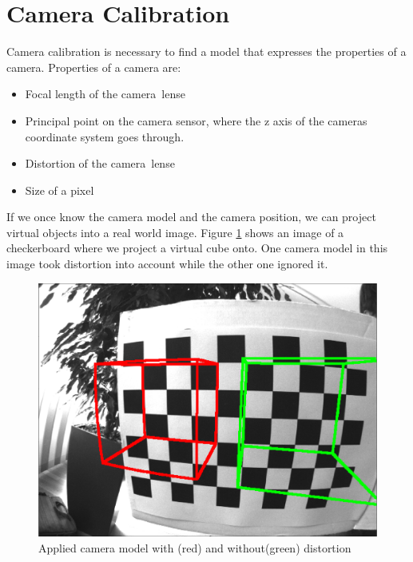 \documentclass[11pt,a4paper,titlepage,oneside]{report}
\begin{document}
\section{Camera Calibration}\label{sec:calibration}
Camera calibration is necessary to find a model that expresses the properties of a camera. Properties of a camera are:

\begin{itemize}
	\item Focal length of the camera lense
	\item Principal point on the camera sensor, where the z axis of the cameras coordinate system goes through.
	\item Distortion of the camera lense
	\item Size of a pixel
\end{itemize}

If we once know the camera model and the camera position, we can project virtual objects into a real world image. Figure \ref{fig:model} shows an image of a checkerboard where we project a virtual cube onto. One camera model in this image took distortion into account while the other one ignored it.
\begin{figure}[H]
  \begin{center}
		\includegraphics[width=1.0\textwidth]{img/model.png}
  \end{center}
	\caption{Applied camera model with (red) and without(green) distortion}\label{fig:model}
\end{figure}
\end{document}
